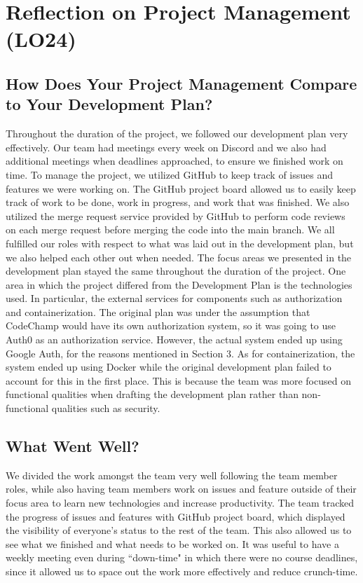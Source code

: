 \documentclass[12pt, titlepage]{article}
\begin{document}
\section{Reflection on Project Management (LO24)}

\subsection{How Does Your Project Management Compare to Your Development Plan?}

Throughout the duration of the project, we followed our development plan very effectively. Our team had meetings every week on Discord and we also had additional meetings when deadlines approached, to ensure we finished work on time. To manage the project, we utilized GitHub to keep track of issues and features we were working on. The GitHub project board allowed us to easily keep track of work to be done, work in progress, and work that was finished. We also utilized the merge request service provided by GitHub to perform code reviews on each merge request before merging the code into the main branch. We all fulfilled our roles with respect to what was laid out in the development plan, but we also helped each other out when needed. The focus areas we presented in the development plan stayed the same throughout the duration of the project. One area in which the project differed from the Development Plan is the technologies used. In particular, the external services for components such as authorization and containerization. The original plan was under the assumption that CodeChamp would have its own authorization system, so it was going to use Auth0 as an authorization service. However, the actual system ended up using Google Auth, for the reasons mentioned in Section 3. As for containerization, the system ended up using Docker while the original development plan failed to account for this in the first place. This is because the team was more focused on functional qualities when drafting the development plan rather than non-functional qualities such as security.

\subsection{What Went Well?}

We divided the work amongst the team very well following the team member roles, while also having team members work on issues and feature outside of their focus area to learn new technologies and increase productivity. The team tracked the progress of issues and features with GitHub project board, which displayed the visibility of everyone's status to the rest of the team. This also allowed us to see what we finished and what needs to be worked on. It was useful to have a weekly meeting even during ``down-time" in which there were no course deadlines, since it allowed us to space out the work more effectively and reduce crunch-time.
\end{document}
